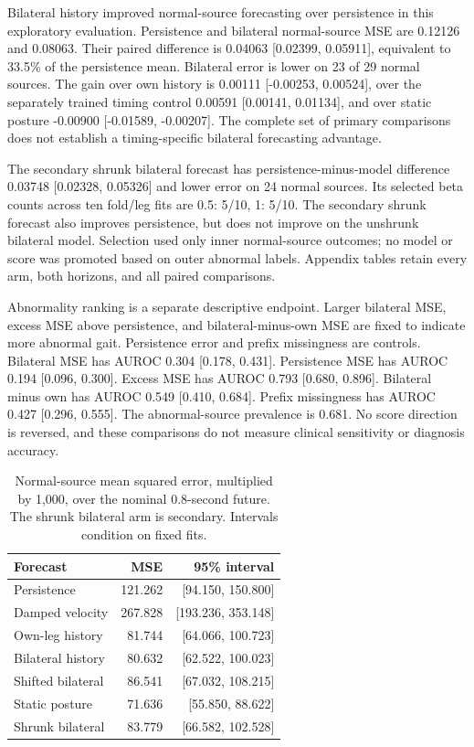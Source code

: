 \documentclass[letterpaper]{article}
\begin{document}
Bilateral history improved normal-source forecasting over persistence in this exploratory evaluation. Persistence and bilateral normal-source MSE are 0.12126 and 0.08063. Their paired difference is 0.04063 [0.02399, 0.05911], equivalent to 33.5\% of the persistence mean. Bilateral error is lower on 23 of 29 normal sources. The gain over own history is 0.00111 [-0.00253, 0.00524], over the separately trained timing control 0.00591 [0.00141, 0.01134], and over static posture -0.00900 [-0.01589, -0.00207]. The complete set of primary comparisons does not establish a timing-specific bilateral forecasting advantage.

The secondary shrunk bilateral forecast has persistence-minus-model difference 0.03748 [0.02328, 0.05326] and lower error on 24 normal sources. Its selected beta counts across ten fold/leg fits are 0.5: 5/10, 1: 5/10. The secondary shrunk forecast also improves persistence, but does not improve on the unshrunk bilateral model. Selection used only inner normal-source outcomes; no model or score was promoted based on outer abnormal labels. Appendix tables retain every arm, both horizons, and all paired comparisons.

Abnormality ranking is a separate descriptive endpoint. Larger bilateral MSE, excess MSE above persistence, and bilateral-minus-own MSE are fixed to indicate more abnormal gait. Persistence error and prefix missingness are controls. Bilateral MSE has AUROC 0.304 [0.178, 0.431]. Persistence MSE has AUROC 0.194 [0.096, 0.300]. Excess MSE has AUROC 0.793 [0.680, 0.896]. Bilateral minus own has AUROC 0.549 [0.410, 0.684]. Prefix missingness has AUROC 0.427 [0.296, 0.555]. The abnormal-source prevalence is 0.681. No score direction is reversed, and these comparisons do not measure clinical sensitivity or diagnosis accuracy.

\begin{table}[t]
\centering
\small
\begin{tabular}{lrr}
\toprule
Forecast & MSE & 95\% interval \\
\midrule
Persistence & 121.262 & [94.150, 150.800] \\
Damped velocity & 267.828 & [193.236, 353.148] \\
Own-leg history & 81.744 & [64.066, 100.723] \\
Bilateral history & 80.632 & [62.522, 100.023] \\
Shifted bilateral & 86.541 & [67.032, 108.215] \\
Static posture & 71.636 & [55.850, 88.622] \\
Shrunk bilateral & 83.779 & [66.582, 102.528] \\
\bottomrule
\end{tabular}
\caption{Normal-source mean squared error, multiplied by 1,000, over the nominal 0.8-second future. The shrunk bilateral arm is secondary. Intervals condition on fixed fits.}
\label{tab:forecast}
\end{table}
\end{document}
